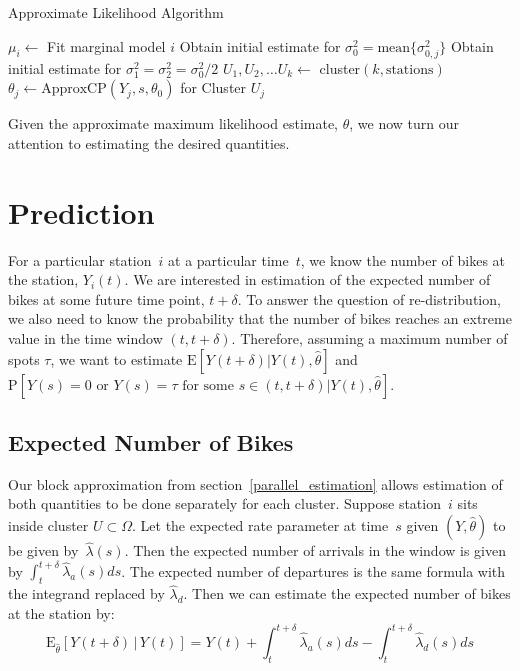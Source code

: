 \documentclass{acm_proc_article-sp}
\begin{document}
\begin{algorithm}[!h]
\caption{Approximate Likelihood Algorithm} \label{applik_alg}
\begin{algorithmic}
\STATE $\mu_i \gets$ Fit marginal model $i$ 
\ENDFOR
\STATE Obtain initial estimate for $\sigma_0^2 = \text{mean} \{ \sigma_{0,j}^2\}$
\STATE Obtain initial estimate for $\sigma_1^2 = \sigma_2^2 = \sigma_0^2 / 2$
\STATE $U_1, U_2, \ldots U_k \gets$ cluster$(k, \text{stations})$
\STATE $\theta_j \gets \text{ApproxCP} (Y_j, s, \theta_0)$ for Cluster $U_j$
\ENDFOR
\end{algorithmic}
\end{algorithm}

Given the approximate maximum likelihood estimate, $\theta$, we now turn our attention to estimating the desired quantities.

\section{Prediction}

For a particular station~$i$ at a particular time~$t$, we know the number of bikes at the station, $Y_i(t)$.  We are interested in estimation of the expected number of bikes at some future time point, $t+\delta$.  To answer the question of re-distribution, we also need to know the probability that the number of bikes reaches an extreme value in the time window $(t, t+\delta)$.  Therefore, assuming a maximum number of spots $\tau$, we want to estimate $\text{E} \left[ Y(t+ \delta) | Y(t) , \hat{\theta} \right]$ and $\text{P} [ Y(s) = 0 \text{ or } Y(s) = \tau \text{ for some } s \in (t, t+\delta) | Y(t), \hat{\theta} ]$.  

\subsection{Expected Number of Bikes}
Our block approximation from section~\ref{parallel_estimation} allows estimation of both quantities to be done separately for each cluster.  Suppose station~$i$ sits inside cluster $U \subset \Omega$.  Let the expected rate parameter at time~$s$ given $(Y,\hat{\theta})$ to be given by~$\hat{\lambda} (s)$.  Then the expected number of arrivals in the window is given by $\int_{t}^{t+\delta} \hat{\lambda}_a (s) ds$.  The expected number of departures is the same formula with the integrand replaced by $\hat{\lambda}_d$.  Then we can estimate the expected number of bikes at the station by:
\begin{equation*}
\text{E}_{\hat{\theta}} \left[ Y(t+ \delta) \, | \, Y(t) \right] = Y(t) + \int_{t}^{t+\delta} \hat{\lambda}_a (s) ds - \int_{t}^{t+\delta} \hat{\lambda}_d (s) ds
\end{equation*}
\end{document}
